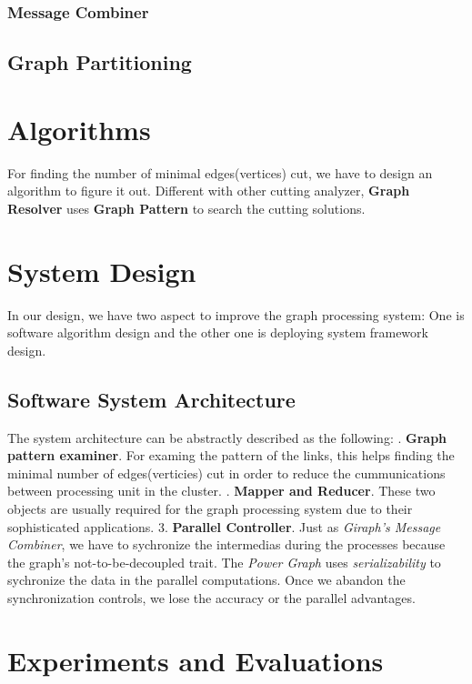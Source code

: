 \documentclass{article}
\begin{document}
	\subsubsection{Message Combiner}
	\subsection{Graph Partitioning}

	\section{Algorithms}
	For finding the number of minimal edges(vertices) cut, we have to design an algorithm to figure it out. Different with other cutting analyzer, \textbf{Graph Resolver} uses \textbf{Graph Pattern}\cite{yan2008mining} to search the cutting solutions.

	\section{System Design}
	In our design, we have two aspect to improve the graph processing system: One is software algorithm design and the other one is deploying system framework design.
	\subsection{Software System Architecture}
	The system architecture can be abstractly described as the following:
	. \textbf{Graph pattern examiner}. For examing the pattern of the links, this helps finding the minimal number of edges(verticies) cut in order to reduce the cummunications between processing unit in the cluster.
	. \textbf{Mapper and Reducer}. These two objects are usually required for the graph processing system due to their sophisticated applications.
	3. \textbf{Parallel Controller}. Just as \emph{Giraph's Message Combiner}, we have to sychronize the intermedias during the processes because the graph's not-to-be-decoupled trait. The \emph{Power Graph} uses \emph{serializability} to sychronize the data in the parallel computations. Once we abandon the synchronization controls, we lose the accuracy or the parallel advantages.

	\section{Experiments and Evaluations}
\end{document}
